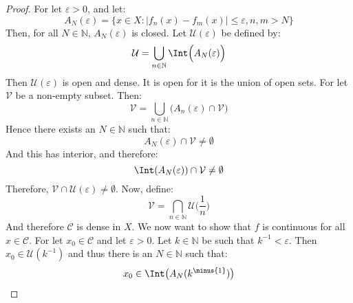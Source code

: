 \documentclass[crop=false,class=article,oneside]{standalone}
\begin{document}
        \begin{proof}
            For let $\varepsilon>0$, and let:
            \begin{equation}
                A_{N}(\varepsilon)=
                \{x\in{X}:|f_{n}(x)-f_{m}(x)|\leq\varepsilon,n,m>N\}
            \end{equation}
            Then, for all $N\in\mathbb{N}$, $A_{N}(\varepsilon)$ is
            closed. Let $\mathcal{U}(\varepsilon)$ be defined by:
            \begin{equation}
                \mathcal{U}=\bigcup_{n\in\mathbb{N}}
                    \Int\Big(A_{N}(\varepsilon)\Big)
            \end{equation}
            Then $\mathcal{U}(\varepsilon)$ is open and dense. It
            is open for it is the union of open sets. For let
            $\mathcal{V}$ be a non-empty subset. Then:
            \begin{equation}
                \mathcal{V}=\bigcup_{n\in\mathbb{N}}
                    \Big(A_{n}(\varepsilon)\cap\mathcal{V}\Big)
            \end{equation}
            Hence there exists an $N\in\mathbb{N}$ such that:
            \begin{equation}
                A_{N}(\varepsilon)\cap\mathcal{V}\ne\emptyset
            \end{equation}
            And this has interior, and therefore:
            \begin{equation}
                \Int(A_{N}(\varepsilon))\cap\mathcal{V}\ne\emptyset
            \end{equation}
            Therefore,
            $\mathcal{V}\cap\mathcal{U}(\varepsilon)\ne\emptyset$.
            Now, define:
            \begin{equation}
                \mathcal{V}=\bigcap_{n\in\mathbb{N}}
                    \mathcal{U}\big(\frac{1}{n}\big)
            \end{equation}
            And therefore $\mathcal{C}$ is dense in $X$. We
            now want to show that $f$ is continuous for all
            $x\in\mathcal{C}$. For let $x_{0}\in\mathcal{C}$ and
            let $\varepsilon>0$. Let $k\in\mathbb{N}$ be such that
            $k^{\minus{1}}<\varepsilon$. Then
            $x_{0}\in\mathcal{U}(k^{\minus{1}})$ and thus there is
            an $N\in\mathbb{N}$ such that:
            \begin{equation}
                x_{0}\in\Int\big(A_{N}(k^{\minus{1}})\big)
            \end{equation}

\end{proof}
\end{document}
